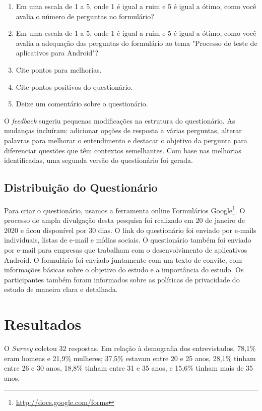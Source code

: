 \begin{enumerate}
    \item Em uma escala de 1 a 5, onde 1 é igual a ruim e 5 é igual a ótimo, como você avalia o número de perguntas no formulário?
    \item Em uma escala de 1 a 5, onde 1 é igual a ruim e 5 é igual a ótimo, como você avalia a adequação das perguntas do formulário ao tema "Processo de teste de aplicativos para Android"?
    \item Cite pontos para melhorias.
    \item Cite pontos positivos do questionário.
    \item Deixe um comentário sobre o questionário.
\end{enumerate}

O \textit{feedback} sugeriu pequenas modificações na estrutura do questionário. As mudanças incluíram: adicionar opções de resposta a várias perguntas, alterar palavras para melhorar o entendimento e destacar o objetivo da pergunta para diferenciar questões que têm contextos semelhantes. Com base nas melhorias identificadas, uma segunda versão do questionário foi gerada.


\subsection{Distribuição do Questionário}

Para criar o questionário, usamos a ferramenta online Formulários Google\footnote{\url{http://docs.google.com/forms}}. O processo de ampla divulgação desta pesquisa foi realizado em 20 de janeiro de 2020 e ficou disponível por 30 dias. O link do questionário foi enviado por e-mails individuais, listas de e-mail e mídias sociais. O questionário também foi enviado por e-mail para empresas que trabalham com o desenvolvimento de aplicativos Android. O formulário foi enviado juntamente com um texto de convite, com informações básicas sobre o objetivo do estudo e a importância do estudo. Os participantes também foram informados sobre as políticas de privacidade do estudo de maneira clara e detalhada.


\section{Resultados}\label{resultssurvey}

O \textit{Survey} coletou 32 respostas. Em relação à demografia dos entrevistados, 78,1\% eram homens e 21,9\% mulheres; 37,5\% estavam entre 20 e 25 anos, 28,1\% tinham entre 26 e 30 anos, 18,8\% tinham entre 31 e 35 anos, e 15,6\% tinham mais de 35 anos.

